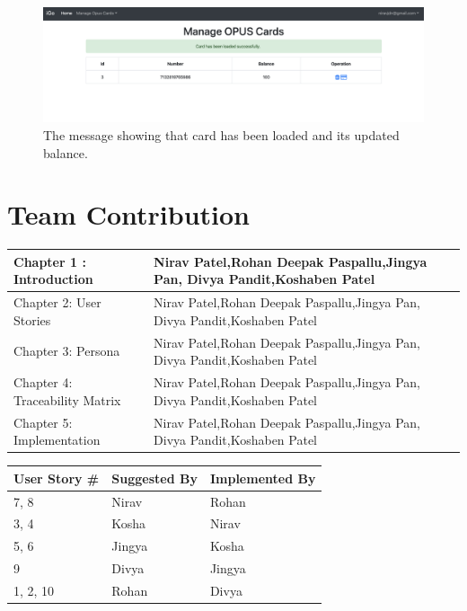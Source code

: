 \documentclass[11pt, english]{report}
\begin{document}
\begin{figure}[H]
  \includegraphics[width=1\textwidth]{images/opus_card_load_successful.png}
  \centering
  \caption{The message showing that card has been loaded and its updated balance.}
\end{figure}



\newpage
\chapter{Team Contribution}

\begin{center}
\begin{tabular}{ | m{20em} | m{8cm}| } 
\hline
Chapter 1 : Introduction & Nirav Patel,Rohan Deepak Paspallu,Jingya Pan,
Divya Pandit,Koshaben Patel\\ 
\hline
Chapter 2: User Stories & Nirav Patel,Rohan Deepak Paspallu,Jingya Pan,
Divya Pandit,Koshaben Patel\\ 
\hline
Chapter 3: Persona & Nirav Patel,Rohan Deepak Paspallu,Jingya Pan,
Divya Pandit,Koshaben Patel\\ 
\hline
Chapter 4: Traceability Matrix & Nirav Patel,Rohan Deepak Paspallu,Jingya Pan,
Divya Pandit,Koshaben Patel\\ 
\hline
Chapter 5: Implementation & Nirav Patel,Rohan Deepak Paspallu,Jingya Pan,
Divya Pandit,Koshaben Patel\\ 
\hline
\end{tabular}

\vspace*{0.5in}
\begin{tabular}{ | m{5em} | m{5cm}| m{5cm}| } 
\hline
User Story # & Suggested By & Implemented By \\
\hline
7, 8 & Nirav & Rohan \\
\hline
3, 4 & Kosha & Nirav \\
\hline
5, 6 & Jingya & Kosha \\
\hline
9 & Divya & Jingya \\
\hline
1, 2, 10 & Rohan & Divya \\
\hline
\end{tabular}

\end{center}


\newpage
\printbibliography
\newpage
\printglossary
\end{document}
